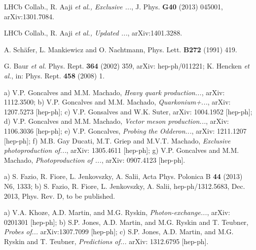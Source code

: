 \documentclass[12pt]{article}
\begin{document}


\begin{thebibliography}{99}
 LHCb Collab., R. Aaji {\it et al., Exclusive ...}, J. Phys. {\bf G40} (2013) 045001, arXiv:1301.7084.

  LHCb Collab., R. Aaji {\it et al., Updated ...}, arXiv:1401.3288.

 A. Sch\"afer, L. Mankiewicz and O. Nachtmann, Phys. Lett. {\bf B272} (1991) 419.

 G. Baur {\it et al.} Phys. Rept. {\bf 364} (2002) 359, arXiv: hep-ph/011221; K. Hencken {\it et al.}, in: Phys. Rept. {\bf 458} (2008) 1.

 a) V.P. Goncalves and M.M. Machado, {\it Heavy quark production...}, arXiv: 1112.3500;
b) V.P. Goncalves and M.M. Machado, {\it Quarkonium+...}, arXiv: 1207.5273 [hep-ph]; c) V.P. Gonsalves and W.K. Suter, arXiv: 1004.1952 [hep-ph];
d) V.P. Goncalves and M.M. Machado, {\it Vector meson production...}, arXiv: 1106.3036 [hep-ph]; e) V.P. Goncalves, {\it Probing the Odderon...},
arXiv: 1211.1207 [hep-ph]; f) M.B. Gay Ducati, M.T. Griep and M.V.T. Machado, {\it Exclusive photoproduction of...}, arXiv: 1305.4611 [hep-ph];
g) V.P. Goncalves and M.M. Machado, {\it Photoproduction of ...}, arXiv: 0907.4123 [hep-ph].

 a) S. Fazio, R. Fiore, L. Jenkovszky, A. Salii, Acta Phys. Polonica B {\bf 44} (2013) N6, 1333; b) S. Fazio, R. Fiore, L. Jenkovszky, A. Salii,
hep-ph/1312.5683, Dec. 2013, Phys. Rev. D, to be published. 


 a) V.A. Khoze, A.D. Martin, and M.G. Ryskin, {\it Photon-exchange...}, arXiv: 0201301 [hep-ph];
b) S.P. Jones, A.D. Martin, and M.G. Ryskin and T. Teubner, {\it Probes of...} arXiv:1307.7099 [hep-ph];
c) S.P. Jones, A.D. Martin, and M.G. Ryskin and T. Teubner, {\it Predictions of...} arXiv: 1312.6795 [hep-ph].


\end{thebibliography}
\end{document}
